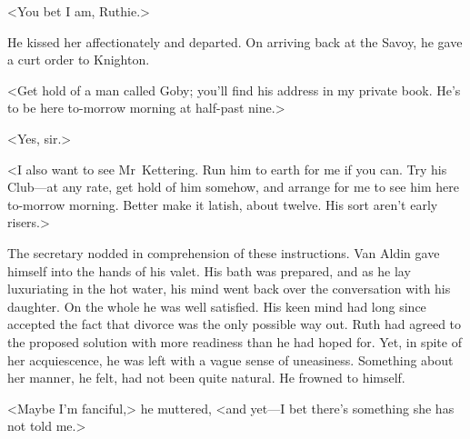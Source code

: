 <You bet I am, Ruthie.>

He kissed her affectionately and departed. On arriving back at the Savoy, he gave a curt order to Knighton.

<Get hold of a man called Goby; you'll find his address in my private book. He's to be here to-morrow morning at half-past nine.>

<Yes, sir.>

<I also want to see Mr~Kettering. Run him to earth for me if you can. Try his Club—at any rate, get hold of him somehow, and arrange for me to see him here to-morrow morning. Better make it latish, about twelve. His sort aren't early risers.>

The secretary nodded in comprehension of these instructions. Van Aldin gave himself into the hands of his valet. His bath was prepared, and as he lay luxuriating in the hot water, his mind went back over the conversation with his daughter. On the whole he was well satisfied. His keen mind had long since accepted the fact that divorce was the only possible way out. Ruth had agreed to the proposed solution with more readiness than he had hoped for. Yet, in spite of her acquiescence, he was left with a vague sense of uneasiness. Something about her manner, he felt, had not been quite natural. He frowned to himself.

<Maybe I'm fanciful,> he muttered, <and yet—I bet there's something she has not told me.>